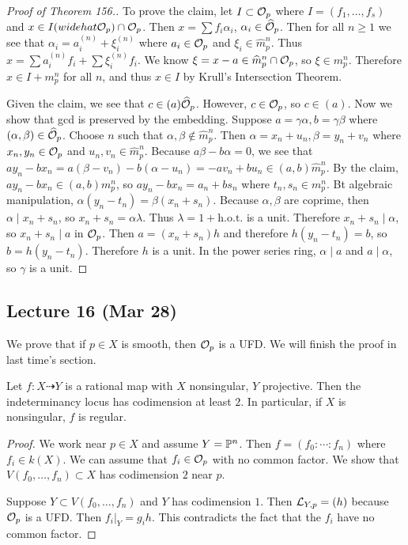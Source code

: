 \documentclass[twoside, 10pt]{article}
\begin{document}
\begin{thm}
\begin{proof}[Proof of Theorem 156.]
            To prove the claim, let $I \subset \mc{O}_p$ where $I = (f_1, \ldots, f_s)$ and $x \in I (widehat{\mc{O}}_p) \cap \mc{O}_p$. Then $x = \sum f_i \alpha_i$, $\alpha_i \in \widehat{\mc{O}}_p$. Then for all $n \geq 1$ we see that $\alpha_i = a_i^{(n)} + \xi_i^{(n)}$ where $a_i \in \mc{O}_p$ and $\xi_i \in \widehat{m}_p^n$. Thus $x = \sum a_i^{(n)} f_i + \sum \xi_i^{(n)} f_i$. We know $\xi = x-a \in \widehat{m}_p^n \cap \mc{O}_p$, so $\xi \in m_p^n$. Therefore $x \in I + m_p^n$ for all $n$, and thus $x \in I$ by Krull's Intersection Theorem.

            Given the claim, we see that $c \in (a)\widehat{\mc{O}}_p$. However, $c \in \mc{O}_p$, so $c \in (a)$. Now we show that gcd is preserved by the embedding. Suppose $a = \gamma \alpha, b = \gamma\beta$ where $(\alpha, \beta) \in \widehat{\mc{O}}_p$. Choose $n$ such that $\alpha, \beta \notin \widehat{m}_p^n$. Then $\alpha = x_n+u_n, \beta = y_n+v_n$ where $x_n, y_n \in \mc{O}_p$ and $u_n, v_n \in \widehat{m}_p^n$. Because $a \beta - b \alpha = 0$, we see that $ay_n - bx_n = a(\beta - v_n) - b (\alpha - u_n) = -av_n + bu_n \in (a,b)\widehat{m}_p^n$. By the claim, $ay_n - bx_n \in (a,b)m_p^n$, so $ay_n - bx_n = a_n + bs_n$ where $t_n,s_n \in m_p^n$. Bt algebraic manipulation, $\alpha(y_n-t_n) = \beta(x_n+s_n)$. Because $\alpha, \beta$ are coprime, then $\alpha \mid x_n+s_n$, so $x_n+s_n = \alpha \lambda$. Thus $\lambda = 1 + \mathrm{h.o.t.}$ is a unit. Therefore $x_n+s_n \mid \alpha$, so $x_n + s_n \mid a$ in $\mc{O}_p$. Then $a = (x_n+s_n)h$ and therefore $h(y_n-t_n) = b$, so $b = h(y_n-t_n)$. Therefore $h$ is a unit. In the power series ring, $\alpha \mid a$ and $a \mid \alpha$, so $\gamma$ is a unit.
        \end{proof}
    \end{thm}

    \subsection{Lecture 16 (Mar 28)}
    We prove that if $p \in X$ is smooth, then $\mc{O}_p$ is a UFD. We will finish the proof in last time's section.
    
    \begin{cor}
        Let $f: X \dashrightarrow Y$ is a rational map with $X$ nonsingular, $Y$ projective. Then the indeterminancy locus has codimension at least $2$. In particular, if $X$ is nonsingular, $f$ is regular.
        \begin{proof}
            We work near $p \in X$ and assume $Y = \P^n$. Then $f = (f_0: \cdots : f_n)$ where $f_i \in k(X)$. We can assume that $f_i \in \mc{O}_p$ with no common factor. We show that $V(f_0, \ldots, f_n) \subset X$ has codimension $2$ near $p$.

            Suppose $Y \subset V(f_0, \ldots, f_n)$ and $Y$ has codimension $1$. Then $\mc{L}_{Y,p} = (h)$ because $\mc{O}_p$ is a UFD. Then $f_i|_Y = g_ih$. This contradicts the fact that the $f_i$ have no common factor.
        \end{proof}
    \end{cor}
    
\end{document}
